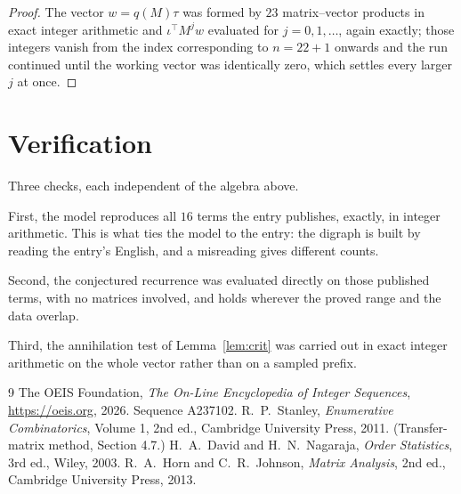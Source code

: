 \documentclass[11pt,a4paper]{article}
\theoremstyle{plain}
\theoremstyle{definition}
\begin{document}
\begin{proof}
The vector $w=q(M)\tau$ was formed by $23$ matrix--vector products in exact integer
arithmetic and $\iota^{\!\top}M^{j}w$ evaluated for $j=0,1,\dots$, again exactly; those
integers vanish from the index corresponding to $n=22+1$ onwards and the run continued
until the working vector was identically zero, which settles every larger $j$ at once.
\end{proof}

\section{Verification}

Three checks, each independent of the algebra above.

First, the model reproduces all $16$ terms the entry publishes, exactly, in integer
arithmetic. This is what ties the model to the entry: the digraph is built by reading the
entry's English, and a misreading gives different counts.

Second, the conjectured recurrence was evaluated directly on those published terms, with no
matrices involved, and holds wherever the proved range and the data overlap.

Third, the annihilation test of Lemma~\ref{lem:crit} was carried out in exact integer
arithmetic on the whole vector rather than on a sampled prefix.

\begin{thebibliography}{9}
 The OEIS Foundation, \emph{The On-Line Encyclopedia of Integer
Sequences}, \url{https://oeis.org}, 2026. Sequence A237102.
 R.~P.~Stanley, \emph{Enumerative Combinatorics}, Volume 1, 2nd ed.,
Cambridge University Press, 2011. (Transfer-matrix method, Section 4.7.)
 H.~A.~David and H.~N.~Nagaraja, \emph{Order Statistics}, 3rd ed., Wiley,
2003.
 R.~A.~Horn and C.~R.~Johnson, \emph{Matrix Analysis}, 2nd ed., Cambridge
University Press, 2013.
\end{thebibliography}
\end{document}
